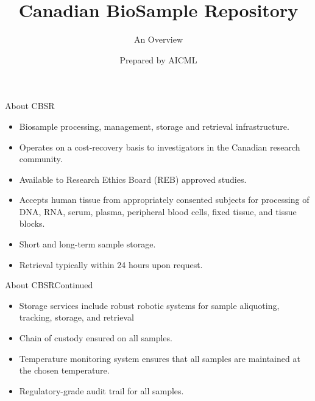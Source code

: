 \documentclass{beamer}
\title[CBSR Overview]{Canadian BioSample Repository}
\subtitle{An Overview}
\author{Prepared by AICML}
\begin{document}
\begin{frame}
  \titlepage
\end{frame}



\begin{frame}{About CBSR}
  \begin{itemize}
    \item Biosample processing, management, storage and retrieval
      infrastructure.
    \item Operates on a cost-recovery basis to investigators in the Canadian
      research community.
    \item Available to Research Ethics Board (REB) approved studies.
    \item Accepts human tissue from appropriately consented subjects for
      processing of DNA, RNA, serum, plasma, peripheral blood cells, fixed
      tissue, and tissue blocks.
    \item Short and long-term sample storage.
    \item Retrieval typically within 24 hours upon request.
  \end{itemize}
\end{frame}

\begin{frame}{About CBSR}{Continued}
  \begin{itemize}
    \item Storage services include robust robotic systems for sample
      aliquoting, tracking, storage, and retrieval
    \item Chain of custody ensured on all samples.
    \item Temperature monitoring system ensures that all samples are maintained
      at the chosen temperature.
    \item Regulatory-grade audit trail for all samples.
  \end{itemize}
\end{frame}
\end{document}
